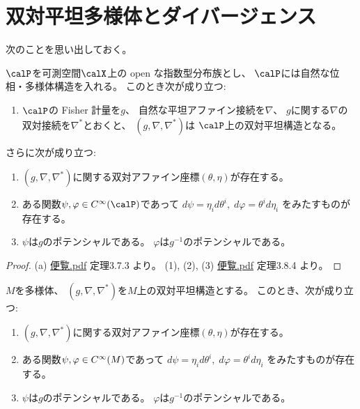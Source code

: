 \documentclass[report]{jlreq}
\begin{document}
%
\section{双対平坦多様体とダイバージェンス}

次のことを思い出しておく。

\begin{proposition}
    $\calP$を可測空間$\calX$上の open な指数型分布族とし、
    $\calP$には自然な位相・多様体構造を入れる。
    このとき次が成り立つ:
    \begin{enumerate}[label=(\alph*)]
        \item $\calP$の Fisher 計量を$g$、
            自然な平坦アファイン接続を$\nabla$、
            $g$に関する$\nabla$の双対接続を$\nabla^*$とおくと、
            $(g, \nabla, \nabla^*)$は
            $\calP$上の双対平坦構造となる。
    \end{enumerate}
    さらに次が成り立つ:
    \begin{enumerate}
        \item $(g, \nabla, \nabla^*)$に関する双対アファイン座標$(\theta, \eta)$が存在する。
        \item ある関数$\psi, \varphi \in \smooth(\calP)$であって
            $d\psi = \eta_i d\theta^i, \;
                d\varphi = \theta^i d\eta_i$
            をみたすものが存在する。
        \item $\psi$は$g$のポテンシャルである。
            $\varphi$は$g^{-1}$のポテンシャルである。
    \end{enumerate}
\end{proposition}

\begin{proof}
    (a) \url{便覧.pdf} 定理3.7.3 より。
    (1), (2), (3) \url{便覧.pdf} 定理3.8.4 より。
\end{proof}

\begin{theorem}[双対アファイン座標と双対ポテンシャルの存在]
    $M$を多様体、
    $(g, \nabla, \nabla^*)$を$M$上の双対平坦構造とする。
    このとき、次が成り立つ:
    \begin{enumerate}
        \item $(g, \nabla, \nabla^*)$に関する双対アファイン座標$(\theta, \eta)$が存在する。
        \item ある関数$\psi, \varphi \in C^\infty(M)$であって
            $d\psi = \eta_i d\theta^i, \;
                d\varphi = \theta^i d\eta_i$
            をみたすものが存在する。
        \item $\psi$は$g$のポテンシャルである。
            $\varphi$は$g^{-1}$のポテンシャルである。
    \end{enumerate}
\end{theorem}
\end{document}
